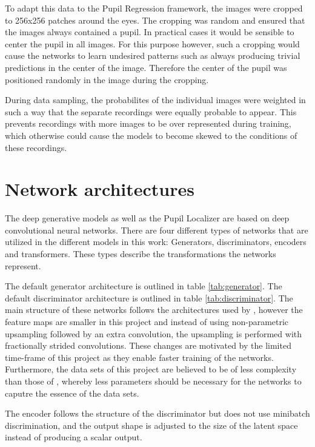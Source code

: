 To adapt this data to the Pupil Regression framework, the images were cropped to 256x256 patches around the eyes. The cropping was random and ensured that the images always contained a pupil. In practical cases it would be sensible to center the pupil in all images. For this purpose however, such a cropping would cause the networks to learn undesired patterns such as always producing trivial predictions in the center of the image. Therefore the center of the pupil was positioned randomly in the image during the cropping. 

During data sampling, the probabilites of the individual images were weighted in such a way that the separate recordings were equally probable to appear. This prevents recordings with more images to be over represented during training, which otherwise could cause the models to become skewed to the conditions of these recordings.

\section{Network architectures}
The deep generative models as well as the Pupil Localizer are based on deep convolutional neural networks. There are four different types of networks that are utilized in the different models in this work: Generators, discriminators, encoders and transformers. These types describe the transformations the networks represent.

The default generator architecture is outlined in table \ref{tab:generator}. The default discriminator architecture is outlined in table \ref{tab:discriminator}. The main structure of these networks follows the architectures used by \textcite{karras2017progressive}, however the feature maps are smaller in this project and instead of using non-parametric upsampling followed by an extra convolution, the upsampling is performed with fractionally strided convolutions. These changes are motivated by the limited time-frame of this project as they enable faster training of the networks. Furthermore, the data sets of this project are believed to be of less complexity than those of \textcite{karras2017progressive}, whereby less parameters should be necessary for the networks to caputre the essence of the data sets.

The encoder follows the structure of the discriminator but does not use minibatch discrimination, and the output shape is adjusted to the size of the latent space instead of producing a scalar output. 

